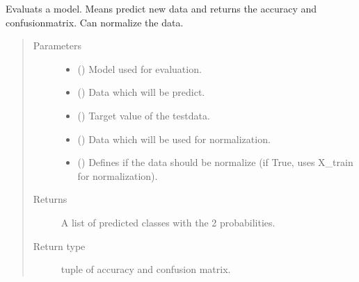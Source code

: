 \documentclass[letterpaper,10pt,english]{sphinxmanual}
\begin{document}
\begin{fulllineitems}
\label{\detokenize{anoog.model:anoog.model.model.evaluate_model}}
\sphinxAtStartPar
Evaluats a model.
Means predict new data and returns the accuracy and confusion\sphinxhyphen{}matrix.
Can normalize the data.
\begin{quote}\begin{description}
\item[{Parameters}] \leavevmode\begin{itemize}
\item {} 
\sphinxAtStartPar
{} () \textendash{} Model used for evaluation.

\item {} 
\sphinxAtStartPar
{} () \textendash{} Data which will be predict.

\item {} 
\sphinxAtStartPar
{} () \textendash{} Target value of the test\sphinxhyphen{}data.

\item {} 
\sphinxAtStartPar
{} () \textendash{} Data which will be used for normalization.

\item {} 
\sphinxAtStartPar
{} (\sphinxstyleliteralemphasis{\sphinxupquote{, }}) \textendash{} Defines if the data should be normalize (if True, uses X\_train for normalization).

\end{itemize}

\item[{Returns}] \leavevmode
\sphinxAtStartPar
A list of predicted classes with the 2 probabilities.

\item[{Return type}] \leavevmode
\sphinxAtStartPar
tuple of accuracy and confusion matrix.

\end{description}\end{quote}

\end{fulllineitems}
\end{document}
